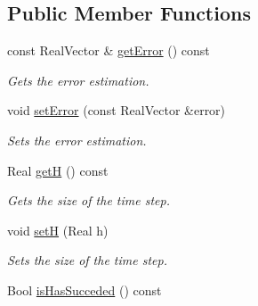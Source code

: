 \subsection*{Public Member Functions}
\begin{DoxyCompactItemize}
\item 
\hypertarget{classMultiRateTRBDF2SolverData_a310271deced3d51c8142442f154f38fd}{
const RealVector \& \hyperlink{classMultiRateTRBDF2SolverData_a310271deced3d51c8142442f154f38fd}{getError} () const }
\label{classMultiRateTRBDF2SolverData_a310271deced3d51c8142442f154f38fd}

\begin{DoxyCompactList}\small\item\em Gets the error estimation. \item\end{DoxyCompactList}\item 
\hypertarget{classMultiRateTRBDF2SolverData_a9086199e30afc0863574c87867f56c1f}{
void \hyperlink{classMultiRateTRBDF2SolverData_a9086199e30afc0863574c87867f56c1f}{setError} (const RealVector \&error)}
\label{classMultiRateTRBDF2SolverData_a9086199e30afc0863574c87867f56c1f}

\begin{DoxyCompactList}\small\item\em Sets the error estimation. \item\end{DoxyCompactList}\item 
\hypertarget{classMultiRateTRBDF2SolverData_a088daa942d6ec822d5799e7d67381b39}{
Real \hyperlink{classMultiRateTRBDF2SolverData_a088daa942d6ec822d5799e7d67381b39}{getH} () const }
\label{classMultiRateTRBDF2SolverData_a088daa942d6ec822d5799e7d67381b39}

\begin{DoxyCompactList}\small\item\em Gets the size of the time step. \item\end{DoxyCompactList}\item 
\hypertarget{classMultiRateTRBDF2SolverData_a8e01b1c6a54135cb30b16ec35750750a}{
void \hyperlink{classMultiRateTRBDF2SolverData_a8e01b1c6a54135cb30b16ec35750750a}{setH} (Real h)}
\label{classMultiRateTRBDF2SolverData_a8e01b1c6a54135cb30b16ec35750750a}

\begin{DoxyCompactList}\small\item\em Sets the size of the time step. \item\end{DoxyCompactList}\item 
\hypertarget{classMultiRateTRBDF2SolverData_a3e9cc3df9e7344c6b4161c6e5dd492c3}{
Bool \hyperlink{classMultiRateTRBDF2SolverData_a3e9cc3df9e7344c6b4161c6e5dd492c3}{isHasSucceded} () const }
\label{classMultiRateTRBDF2SolverData_a3e9cc3df9e7344c6b4161c6e5dd492c3}


\end{DoxyCompactItemize}

